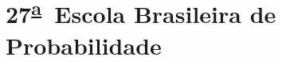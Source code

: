\documentclass{hipatia}
\newcommand{\superau}{\textsuperscript{\underline{a}}~}
\begin{document}
\section{27\superau Escola Brasileira de Probabilidade} %
%
%
%
%
\end{document}

